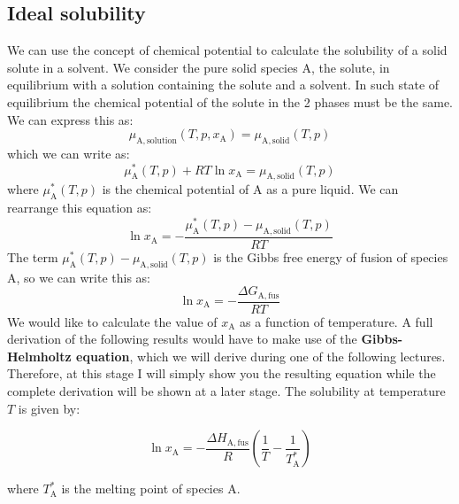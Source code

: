 \documentclass[12pt,a4paper]{report}
\newif\ifstudents
\begin{document}
  \subsection*{Ideal solubility}
  We can use the concept of chemical potential to calculate the solubility of a solid solute in a solvent. We consider the pure solid species A, the solute, in equilibrium with a solution containing the solute and a solvent. In such state of equilibrium the chemical potential of the solute in the 2 phases must be the same. We can express this as:
   \begin{equation*}
   \mu_{\mathrm{A,solution}}(T,p,x_{\mathrm{A}}) = \mu_{\mathrm{A,solid}}(T,p)
   \end{equation*} 
   which we can write as:
   \begin{equation*}
   \mu^{*}_{\mathrm{A}}(T,p)+RT\ln x_{\mathrm{A}} = \mu_{\mathrm{A,solid}}(T,p)
   \end{equation*} 
   where $\mu^{*}_{\mathrm{A}}(T,p)$ is the chemical potential of A as a pure liquid. We can rearrange this equation as:
   \begin{equation*}
   \ln x_{\mathrm{A}} = -\frac{\mu^{*}_{\mathrm{A}}(T,p)-\mu_{\mathrm{A,solid}}(T,p)}{RT}
   \end{equation*} 
   The term $\mu^{*}_{\mathrm{A}}(T,p)-\mu_{\mathrm{A,solid}}(T,p)$ is the Gibbs free energy of fusion of species A, so we can write this as:
   \begin{equation*}
   \ln x_{\mathrm{A}} = -\frac{\Delta G_{\mathrm{A,fus}}}{RT}
   \end{equation*} 
   We would like to calculate the value of $x_{\mathrm{A}}$ as a function of temperature. A full derivation of the following results would have to make use of the \textbf{Gibbs-Helmholtz equation}, which we will derive during one of the following lectures. Therefore, at this stage I will simply show you the resulting equation while the complete derivation will be shown at a later stage. The solubility at temperature $T$ is given by:
   \ifstudents \hideit[2]{ \fi
   \begin{equation*}
   \ln x_{\mathrm{A}} = -\frac{\Delta H_{\mathrm{A,fus}}}{R}(\frac{1}{T}-\frac{1}{T^{*}_{\mathrm{A}}})
   \end{equation*}
   \ifstudents } \fi
where $T^{*}_{\mathrm{A}}$ is the melting point of species A.
\end{document}
